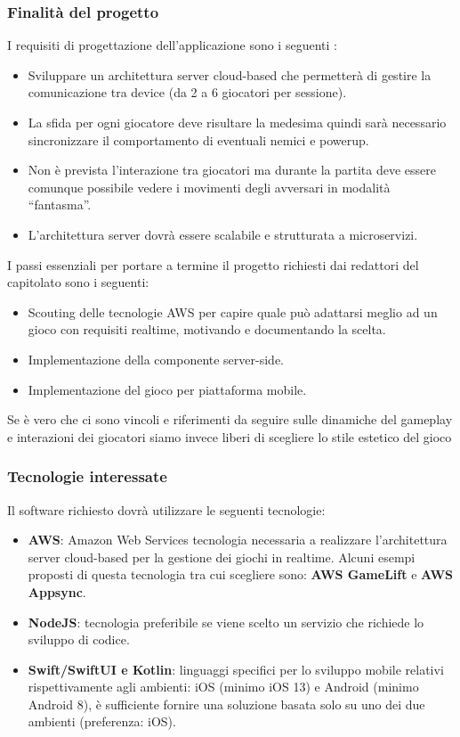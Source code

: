 		\subsubsection{Finalità del progetto}
			I requisiti di progettazione dell’applicazione sono i seguenti :
			\begin{itemize}
				\item Sviluppare un architettura server cloud-based che permetterà di gestire la comunicazione tra device (da 2 a 6 giocatori per sessione).
				\item La sfida per ogni giocatore deve risultare la medesima quindi sarà necessario sincronizzare il comportamento di eventuali nemici e powerup. 
				\item Non è prevista l’interazione tra giocatori ma durante la partita deve essere comunque possibile vedere i movimenti degli avversari in modalità “fantasma”.
				\item L’architettura server dovrà essere scalabile e strutturata a microservizi.
			\end{itemize}
			 I passi essenziali per portare a termine il progetto richiesti dai redattori del capitolato sono i seguenti:
			\begin{itemize}
				\item Scouting delle tecnologie AWS per capire quale può adattarsi meglio ad un gioco con requisiti realtime, motivando e documentando la scelta.
				\item Implementazione della componente server-side.
				\item Implementazione del gioco per piattaforma mobile.
			\end{itemize}
			Se è vero che ci sono vincoli e riferimenti da seguire sulle dinamiche del gameplay e interazioni dei giocatori siamo invece liberi di scegliere lo stile estetico del gioco
		\subsubsection{Tecnologie interessate}
			Il software richiesto dovrà utilizzare le seguenti tecnologie:
			\begin{itemize}
				\item\textbf{AWS}: Amazon Web Services tecnologia necessaria a realizzare l’architettura server cloud-based per la gestione dei giochi in realtime. Alcuni esempi proposti di questa tecnologia tra cui scegliere sono: \textbf{AWS GameLift} e \textbf{AWS Appsync}.
				\item\textbf{NodeJS}: tecnologia preferibile se viene scelto un servizio che richiede lo sviluppo di codice.
				\item\textbf{Swift/SwiftUI e Kotlin}:  linguaggi specifici per lo sviluppo mobile relativi rispettivamente agli ambienti: iOS (minimo iOS 13) e Android (minimo Android 8), è sufficiente fornire una soluzione basata solo su uno dei due ambienti (preferenza: iOS).
			\end{itemize}
			
